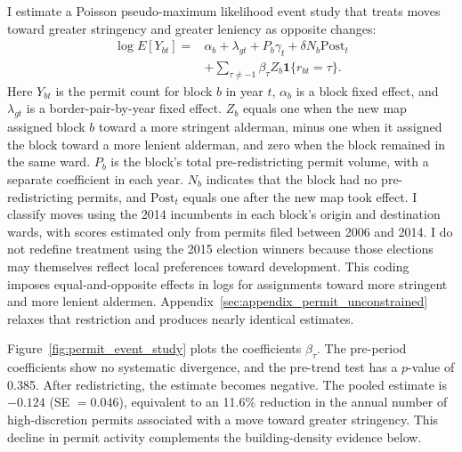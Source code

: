 I estimate a Poisson pseudo-maximum likelihood event study that treats moves toward greater stringency and greater leniency as opposite changes:
%
\begin{equation}
\label{eq:event_study_permits}
\begin{aligned}
\log E[Y_{bt}] ={}&
\alpha_b + \lambda_{gt} + P_b\gamma_t
+ \delta N_b\text{Post}_t \\
&+ \sum_{\tau \neq -1}
\beta_\tau Z_b \mathbf{1}\{r_{bt}=\tau\}.
\end{aligned}
\end{equation}
%
Here $Y_{bt}$ is the permit count for block $b$ in year $t$, $\alpha_b$ is a block fixed effect, and $\lambda_{gt}$ is a border-pair-by-year fixed effect.
$Z_b$ equals one when the new map assigned block $b$ toward a more stringent alderman, minus one when it assigned the block toward a more lenient alderman, and zero when the block remained in the same ward.
$P_b$ is the block's total pre-redistricting permit volume, with a separate coefficient in each year.
$N_b$ indicates that the block had no pre-redistricting permits, and $\text{Post}_t$ equals one after the new map took effect.
I classify moves using the 2014 incumbents in each block's origin and destination wards, with scores estimated only from permits filed between 2006 and 2014.
I do not redefine treatment using the 2015 election winners because those elections may themselves reflect local preferences toward development.
This coding imposes equal-and-opposite effects in logs for assignments toward more stringent and more lenient aldermen.
Appendix~\ref{sec:appendix_permit_unconstrained} relaxes that restriction and produces nearly identical estimates.

Figure~\ref{fig:permit_event_study} plots the coefficients $\beta_\tau$.
The pre-period coefficients show no systematic divergence, and the pre-trend test has a $p$-value of 0.385.
After redistricting, the estimate becomes negative.
The pooled estimate is $-0.124$ (SE $=0.046$), equivalent to an 11.6\% reduction in the annual number of high-discretion permits associated with a move toward greater stringency.
This decline in permit activity complements the building-density evidence below.

